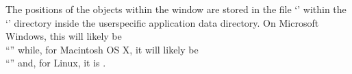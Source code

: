 The positions of the objects within the window are stored in the file
`' within the `' directory inside the
user\longDash{}specific application data directory.
On Microsoft Windows, this will likely be\\
``'' while, for Macintosh OS X, it will likely be\\
``'' and, for Linux, it is \TBD.\\
\primaryEnd{}
